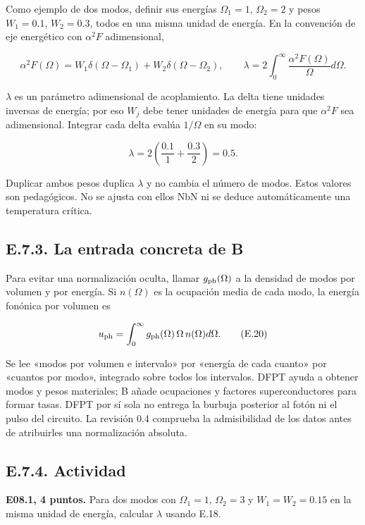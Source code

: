 \documentclass[
  spanish,
  10pt,
  a4paper,
]{article}
\begin{document}
Como ejemplo de dos modos, definir sus energías \(\Omega_1=1\),
\(\Omega_2=2\) y pesos \(W_1=0.1\), \(W_2=0.3\), todos en una misma
unidad de energía. En la convención de eje energético con \(\alpha^2F\)
adimensional,

\[
\alpha^2F(\Omega)=W_1\delta(\Omega-\Omega_1)+W_2\delta(\Omega-\Omega_2),
\qquad
\lambda=2\int_0^\infty\frac{\alpha^2F(\Omega)}{\Omega}d\Omega.
\tag{E.18}
\]

\(\lambda\) es un parámetro adimensional de acoplamiento. La delta tiene
unidades inversas de energía; por eso \(W_j\) debe tener unidades de
energía para que \(\alpha^2F\) sea adimensional. Integrar cada delta
evalúa \(1/\Omega\) en su modo:

\[
\lambda=2\left(\frac{0.1}{1}+\frac{0.3}{2}\right)=0.5.
\tag{E.19}
\]

Duplicar ambos pesos duplica \(\lambda\) y no cambia el número de modos.
Estos valores son pedagógicos. No se ajusta con ellos NbN ni se deduce
automáticamente una temperatura crítica.

\subsection{E.7.3. La entrada concreta de
B}\label{e.7.3.-la-entrada-concreta-de-b}

Para evitar una normalización oculta, llamar \(g_{\rm ph}(\Omega)\) a la
densidad de modos por volumen y por energía. Si \(n(\Omega)\) es la
ocupación media de cada modo, la energía fonónica por volumen es

\[
u_{\rm ph}=\int_0^\infty g_{\rm ph}(\Omega)\,\Omega\,n(\Omega)d\Omega.
\tag{E.20}
\]

Se lee «modos por volumen e intervalo» por «energía de cada cuanto» por
«cuantos por modo», integrado sobre todos los intervalos. DFPT ayuda a
obtener modos y pesos materiales; B añade ocupaciones y factores
superconductores para formar tasas. DFPT por sí sola no entrega la
burbuja posterior al fotón ni el pulso del circuito. La revisión 0.4
comprueba la admisibilidad de los datos antes de atribuirles una
normalización absoluta.

\subsection{E.7.4. Actividad}\label{e.7.4.-actividad}


\textbf{E08.1, 4 puntos.} Para dos modos con \(\Omega_1=1\),
\(\Omega_2=3\) y \(W_1=W_2=0.15\) en la misma unidad de energía,
calcular \(\lambda\) usando E.18.
\end{document}
